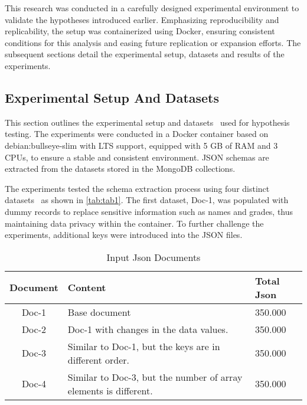 \documentclass[sigconf, nonacm]{acmart}
\begin{document}
This research was conducted in a carefully designed experimental environment to validate the hypotheses introduced earlier. Emphasizing reproducibility and replicability, the setup was containerized using Docker, ensuring consistent conditions for this analysis and easing future replication or expansion efforts. The subsequent sections detail the experimental setup, datasets and results of the experiments.

\subsection{Experimental Setup And Datasets }

This section outlines the experimental setup and datasets~\cite{JsonData} used for hypothesis testing. The experiments were conducted in a Docker container based on debian:bullseye-slim with LTS support, equipped with 5 GB of RAM and 3 CPUs, to ensure a stable and consistent environment. JSON schemas are extracted from the datasets stored in the MongoDB collections.

The experiments tested the schema extraction process using four distinct datasets~\cite{JsonData} as shown in \autoref{tab:tab1}. The first dataset, Doc-1, was populated with dummy records to replace sensitive information such as names and grades, thus maintaining data privacy within the container. To further challenge the experiments, additional keys were introduced into the JSON files.

\begin{table}
  \caption{Input Json Documents}
  \label{tab:tab1}
  \begin{tabular}{cp{4cm}l}
    \toprule
    \small Document& \small Content& \small Total Json\\
    \midrule
    \small Doc-1& \small Base document& \small 350.000\\
    \small Doc-2& \small Doc-1 with changes in the data values.& \small 350.000\\
    \small Doc-3& \small Similar to Doc-1, but the keys are in different order.& \small 350.000\\
    \small Doc-4& \small Similar to Doc-3, but the number of array elements is different.& \small 350.000\\
  \bottomrule
\end{tabular}
\end{table}
\end{document}
